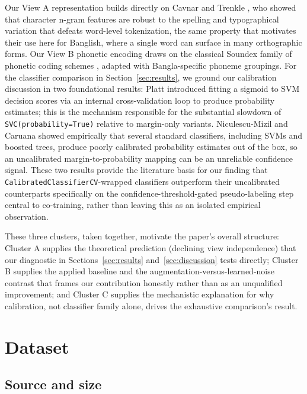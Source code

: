 \documentclass[conference]{IEEEtran}
\begin{document}
Our View A representation builds directly on Cavnar and Trenkle
\citep{cavnar1994ngram}, who showed that character n-gram features are robust
to the spelling and typographical variation that defeats word-level
tokenization, the same property that motivates their use here for Banglish,
where a single word can surface in many orthographic forms. Our View B
phonetic encoding draws on the classical Soundex family of phonetic coding
schemes \citep{russell1918index, russell1922index}, adapted with
Bangla-specific phoneme groupings. For the classifier comparison in
Section~\ref{sec:results}, we ground our calibration discussion in two
foundational results: Platt \citep{platt1999probabilistic} introduced fitting a sigmoid to SVM
decision scores via an internal cross-validation loop to produce probability
estimates; this is the mechanism responsible for the substantial slowdown of
\texttt{SVC(probability=True)} relative to margin-only variants. Niculescu-Mizil
and Caruana \citep{niculescumizil2005predicting} showed empirically that
several standard classifiers, including SVMs and boosted trees, produce poorly
calibrated probability estimates out of the box, so an uncalibrated
margin-to-probability mapping can be an unreliable confidence signal. These two results provide the literature basis
for our finding that \texttt{CalibratedClassifierCV}-wrapped classifiers
outperform their uncalibrated counterparts specifically on the
confidence-threshold-gated pseudo-labeling step central to co-training, rather
than leaving this as an isolated empirical observation.

These three clusters, taken together, motivate the paper's overall structure:
Cluster A supplies the theoretical prediction (declining view independence)
that our diagnostic in Sections~\ref{sec:results} and~\ref{sec:discussion}
tests directly; Cluster B supplies the applied baseline and the
augmentation-versus-learned-noise contrast that frames our contribution
honestly rather than as an unqualified improvement; and Cluster C supplies the
mechanistic explanation for why calibration, not classifier family alone,
drives the exhaustive comparison's result.

\section{Dataset}
\label{sec:dataset}
\subsection{Source and size}
\end{document}
